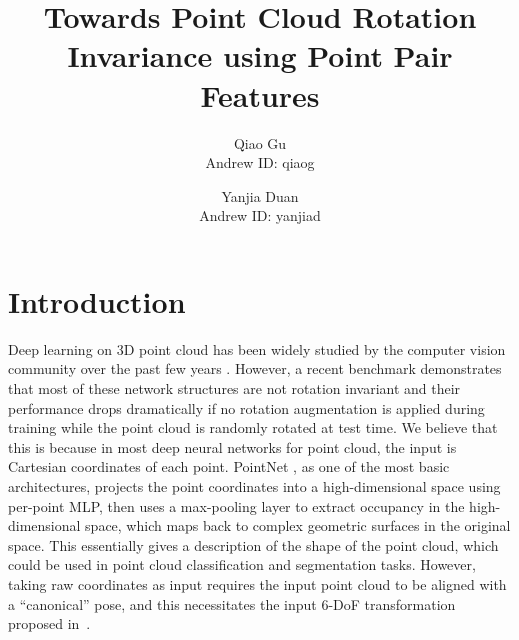 \documentclass{article}
\title{Towards Point Cloud Rotation Invariance using Point Pair Features}
\author{Qiao Gu \\
  Andrew ID: qiaog
  \and
  Yanjia Duan \\
  Andrew ID: yanjiad
  }
\date{}
\begin{document}
\maketitle


\section{Introduction}

Deep learning on 3D point cloud has been widely studied by the computer vision community over the past few years \cite{Qi2017pointnet, qi2017pointnet2, Wang2019-dgcnn, Li2018-PointCNN}. 
However, a recent benchmark \cite{taghanaki2020robustpointset} demonstrates that most of these network structures are not rotation invariant and their performance drops dramatically if no rotation augmentation is applied during training while the point cloud is randomly rotated at test time. 
We believe that this is because in most deep neural networks for point cloud, the input is Cartesian coordinates of each point. PointNet \cite{Qi2017pointnet}, as one of the most basic architectures, projects the point coordinates into a high-dimensional space using per-point MLP, then uses a max-pooling layer to extract occupancy in the high-dimensional space, which maps back to complex geometric surfaces in the original space. This essentially gives a description of the shape of the point cloud, which could be used in point cloud classification and segmentation tasks.
However, taking raw coordinates as input requires the input point cloud to be aligned with a ``canonical'' pose, and this necessitates the input 6-DoF transformation proposed in~\cite{Qi2017pointnet}. 
\end{document}
